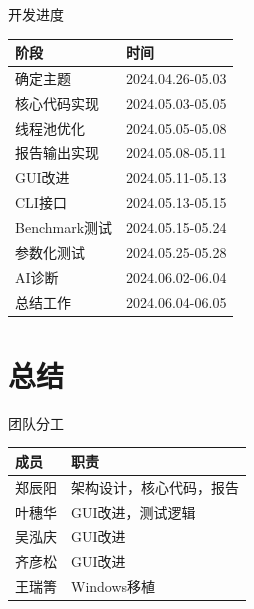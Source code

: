 \documentclass{beamer}
\begin{document}
\begin{frame}{开发进度}
    \begin{table}
        \centering
        \begin{tabular}{|l|l|}
            \hline
            \textbf{阶段} & \textbf{时间}      \\
            \hline
            确定主题        & 2024.04.26-05.03 \\
            核心代码实现      & 2024.05.03-05.05 \\
            线程池优化       & 2024.05.05-05.08 \\
            报告输出实现      & 2024.05.08-05.11 \\
            GUI改进       & 2024.05.11-05.13 \\
            CLI接口       & 2024.05.13-05.15 \\
            Benchmark测试 & 2024.05.15-05.24 \\
            参数化测试       & 2024.05.25-05.28 \\
            AI诊断        & 2024.06.02-06.04 \\
            总结工作        & 2024.06.04-06.05 \\
            \hline
        \end{tabular}
    \end{table}
\end{frame}

\section{总结}
\begin{frame}{团队分工}
    \begin{table}
        \centering
        \begin{tabular}{|l|l|}
            \hline
            \textbf{成员} & \textbf{职责}  \\
            \hline
            郑辰阳         & 架构设计，核心代码，报告 \\
            叶穗华         & GUI改进，测试逻辑   \\
            吴泓庆         & GUI改进        \\
            齐彦松         & GUI改进        \\
            王瑞箐         & Windows移植    \\
            \hline
        \end{tabular}
    \end{table}
\end{frame}
\end{document}
